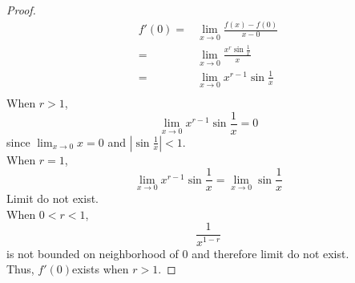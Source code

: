 \documentclass{article}
\begin{document}
    \section{}
        \begin{proof}
            \begin{equation*}
                \begin{split}
                    f'(0)=&\lim_{x\rightarrow 0}\frac{f(x)-f(0)}{x-0}\\ 
                        =&\lim_{x\rightarrow 0} \frac{x^r\sin \frac{1}{x}}{x}\\
                        =&\lim_{x\rightarrow 0} x^{r-1}\sin \frac{1}{x}\\
                \end{split}
            \end{equation*}
            When $r>1$,\\
            $$\lim_{x\rightarrow 0} x^{r-1}\sin \frac{1}{x}=0$$
            since $\lim_{x\rightarrow 0} x=0$ and $|\sin \frac{1}{x}|<1$.\\
            When $r=1$,\\
            $$\lim_{x\rightarrow 0} x^{r-1}\sin \frac{1}{x}=\lim_{x\rightarrow 0}\sin\frac{1}{x}$$
            Limit do not exist.\\
            When $0<r<1$,\\
            $$\frac{1}{x^{1-r}}$$ is not bounded on neighborhood of $0$ and therefore limit do not exist.\\
            Thus, $f'(0)$exists when $r>1$.
        \end{proof}
\end{document}

